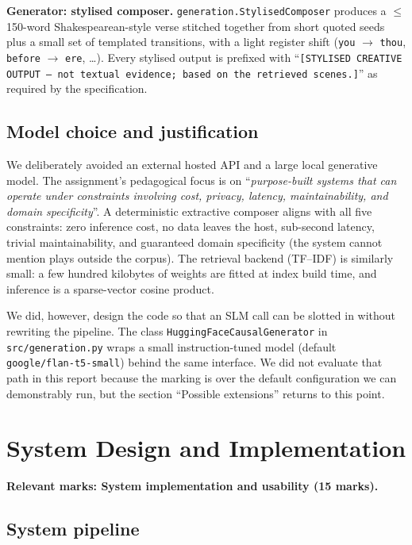 \documentclass[10pt,twocolumn,a4paper]{article}
\begin{document}
\textbf{Generator: stylised composer.}
\verb|generation.StylisedComposer| produces a $\leq$150-word
Shakespearean-style verse stitched together from short quoted seeds
plus a small set of templated transitions, with a light register
shift (\texttt{you} $\to$ \texttt{thou}, \texttt{before} $\to$
\texttt{ere}, \ldots). Every stylised output is prefixed with
``\texttt{[STYLISED CREATIVE OUTPUT -- not textual evidence; based on
the retrieved scenes.]}'' as required by the specification.

\subsection{Model choice and justification}

We deliberately avoided an external hosted API and a large local
generative model. The assignment's pedagogical focus is on
``\emph{purpose-built systems that can operate under constraints involving
cost, privacy, latency, maintainability, and domain specificity}''.
A deterministic extractive composer aligns with all five constraints:
zero inference cost, no data leaves the host, sub-second latency,
trivial maintainability, and guaranteed domain specificity (the system
cannot mention plays outside the corpus). The retrieval backend
(TF--IDF) is similarly small: a few hundred kilobytes of weights are
fitted at index build time, and inference is a sparse-vector cosine
product.

We did, however, design the code so that an SLM call can be slotted
in without rewriting the pipeline. The class
\verb|HuggingFaceCausalGenerator| in \verb|src/generation.py| wraps a
small instruction-tuned model (default
\verb|google/flan-t5-small|) behind the same interface. We did not
evaluate that path in this report because the marking is over the
default configuration we can demonstrably run, but the section
``Possible extensions'' returns to this point.

\section{System Design and Implementation}
\label{sec:system}

\textbf{Relevant marks: System implementation and usability (15 marks).}

\subsection{System pipeline}
\end{document}
